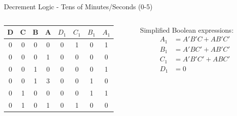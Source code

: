 \documentclass{beamer}
\begin{document}
\begin{frame}{Decrement Logic - Tens of Minutes/Seconds (0-5)}
    \begin{columns}
        \begin{column}{0.5\textwidth}
            \begin{table}
                \centering
                \scriptsize
                \begin{tabular}{|c|c|c|c|c|c|c|c|}
                \hline
                D & C & B & A & $D_1$ & $C_1$ & $B_1$ & $A_1$ \\ 
                \hline
                0 & 0 & 0 & 0 & 0 & 1 & 0 & 1 \\
                0 & 0 & 0 & 1 & 0 & 0 & 0 & 0 \\
                0 & 0 & 1 & 0 & 0 & 0 & 0 & 1 \\
                0 & 0 & 1 & 3 & 0 & 0 & 1 & 0 \\
                0 & 1 & 0 & 0 & 0 & 0 & 1 & 1 \\
                0 & 1 & 0 & 1 & 0 & 1 & 0 & 0 \\
                \hline
                \end{tabular}
            \end{table}
        \end{column}
        \begin{column}{0.5\textwidth}
            Simplified Boolean expressions:
            \begin{align*}
                A_1 &= A'B'C + AB'C' \\
                B_1 &= A'BC' + AB'C' \\
                C_1 &= A'B'C' + ABC' \\
                D_1 &= 0
            \end{align*}
        \end{column}
    \end{columns}
\end{frame}
\end{document}
